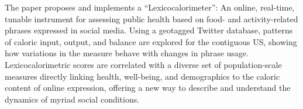 The paper proposes and implements a ``Lexicocalorimeter'':
An online, real-time, tunable instrument for assessing public health based
on food- and activity-related phrases expressed in social media.
Using a geotagged Twitter database,
patterns of caloric input, output, and balance
are explored for the contiguous US,
showing how variations in the measure behave with
changes in phrase usage.
Lexicocalorimetric scores
are correlated with a diverse set of population-scale
measures directly linking health, well-being, and demographics
to the caloric content of online expression,
offering a new way to describe and understand the dynamics of myriad social conditions.
